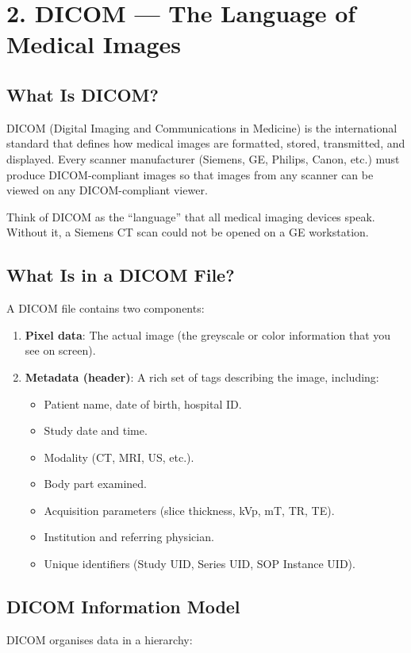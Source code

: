 \section*{2. DICOM --- The Language of Medical Images}

\subsection*{What Is DICOM?}
DICOM (Digital Imaging and Communications in Medicine) is the international standard that defines how medical images are formatted, stored, transmitted, and displayed. Every scanner manufacturer (Siemens, GE, Philips, Canon, etc.) must produce DICOM-compliant images so that images from any scanner can be viewed on any DICOM-compliant viewer.

Think of DICOM as the ``language'' that all medical imaging devices speak. Without it, a Siemens CT scan could not be opened on a GE workstation.

\subsection*{What Is in a DICOM File?}
A DICOM file contains two components:
\begin{enumerate}
    \item \textbf{Pixel data}: The actual image (the greyscale or color information that you see on screen).
    \item \textbf{Metadata (header)}: A rich set of tags describing the image, including:
    \begin{itemize}
        \item Patient name, date of birth, hospital ID.
        \item Study date and time.
        \item Modality (CT, MRI, US, etc.).
        \item Body part examined.
        \item Acquisition parameters (slice thickness, kVp, mT, TR, TE).
        \item Institution and referring physician.
        \item Unique identifiers (Study UID, Series UID, SOP Instance UID).
    \end{itemize}
\end{enumerate}

\subsection*{DICOM Information Model}
DICOM organises data in a hierarchy:


